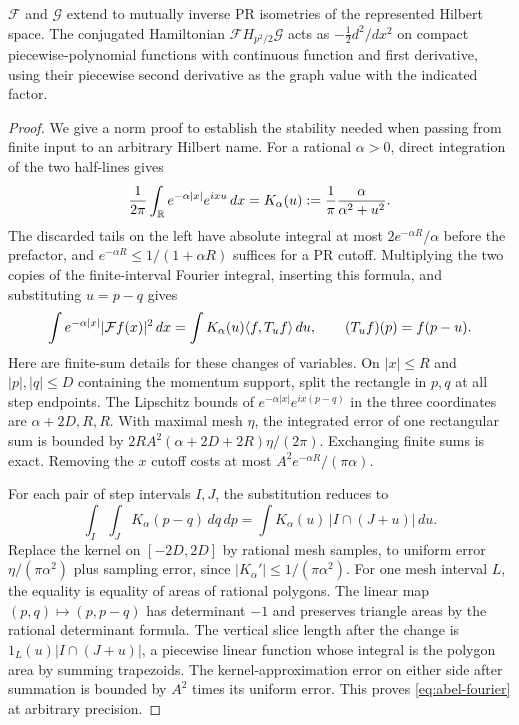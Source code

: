 \begin{theorem}\label{thm:pr-fourier}
$\mathcal F$ and $\mathcal G$ extend to mutually inverse PR isometries of
the represented Hilbert space. The conjugated Hamiltonian
$\mathcal F H_{p^2/2}\mathcal G$ acts as $-\frac12 d^2/dx^2$ on compact
piecewise-polynomial functions with continuous function and first
derivative, using their piecewise second derivative as the graph value
with the indicated factor.
\end{theorem}
\begin{proof}
We give a norm proof to establish the stability needed when passing
from finite input to an arbitrary Hilbert name. For a rational
$\alpha>0$, direct integration of the two half-lines gives
\[
 {1\over 2\pi}\int_{\mathbb R}e^{-\alpha|x|} e^{ixu}\,dx
       =K_\alpha(u):={1\over\pi}{\alpha\over \alpha^2+u^2}.
\]
The discarded tails on the left have absolute integral at most
$2e^{-\alpha R}/\alpha$ before the prefactor, and
$e^{-\alpha R}\le1/(1+\alpha R)$ suffices for a PR cutoff.
Multiplying the two copies of the finite-interval Fourier integral,
inserting this formula, and substituting $u=p-q$ gives
\begin{equation}\label{eq:abel-fourier}
 \int e^{-\alpha|x|}|{\cal F}f(x)|^2\,dx
     =\int K_\alpha(u)\langle f,T_u f\rangle\,du,\qquad
 (T_u f)(p)=f(p-u).
\end{equation}
Here are finite-sum details for these changes of variables. On
$|x|\le R$ and $|p|,|q|\le D$ containing the momentum support, split
the rectangle in $p,q$ at all step endpoints. The Lipschitz bounds of
$e^{-\alpha|x|}e^{ix(p-q)}$ in the three coordinates are
$\alpha+2D,R,R$. With maximal mesh $\eta$, the integrated error of
one rectangular sum is bounded by
$2R A^2(\alpha+2D+2R)\eta/(2\pi)$. Exchanging finite sums is exact.
Removing the $x$ cutoff costs at most $A^2 e^{-\alpha R}/(\pi\alpha)$.

For each pair of step intervals $I,J$, the substitution reduces to
\[
 \int_I\int_J K_\alpha(p-q)\,dq\,dp
 =\int K_\alpha(u)\,|I\cap(J+u)|\,du.
\]
Replace the kernel on $[-2D,2D]$ by rational mesh samples, to uniform
error $\eta/(\pi\alpha^2)$ plus sampling error, since
$|K_\alpha'|\le1/(\pi\alpha^2)$.
For one mesh interval $L$, the equality is equality of areas of rational
polygons. The linear map $(p,q)\mapsto(p,p-q)$ has determinant $-1$
and preserves triangle areas by the rational determinant formula. The
vertical slice length after the change is
$1_L(u)|I\cap(J+u)|$, a piecewise linear function whose integral is the
polygon area by summing trapezoids. The kernel-approximation error on
either side after summation is bounded by $A^2$ times its uniform error.
This proves \eqref{eq:abel-fourier} at arbitrary precision.


\end{proof}
